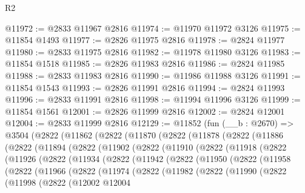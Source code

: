 \begin{lexlean}{R2}
\begin{coremodule}
@11972 := @2833 @11967 @2816
@11974 := @11970 @11972 @3126
@11975 := @11854 @1493
@11977 := @2826 @11975 @2816
@11978 := @2824 @11977
@11980 := @2833 @11975 @2816
@11982 := @11978 @11980 @3126
@11983 := @11854 @1518
@11985 := @2826 @11983 @2816
@11986 := @2824 @11985
@11988 := @2833 @11983 @2816
@11990 := @11986 @11988 @3126
@11991 := @11854 @1543
@11993 := @2826 @11991 @2816
@11994 := @2824 @11993
@11996 := @2833 @11991 @2816
@11998 := @11994 @11996 @3126
@11999 := @11854 @1561
@12001 := @2826 @11999 @2816
@12002 := @2824 @12001
@12004 := @2833 @11999 @2816
@12129 := @11852
    (fun (__b : @2670) =>
    @3504
      (@2822
        (@11862
          (@2822
            (@11870
              (@2822
                (@11878
                  (@2822
                    (@11886
                      (@2822
                        (@11894
                          (@2822
                            (@11902
                              (@2822
                                (@11910
                                  (@2822
                                    (@11918
                                      (@2822
                                        (@11926
                                          (@2822
                                            (@11934
                                              (@2822
                                                (@11942
                                                  (@2822
                                                    (@11950
                                                      (@2822
                                                        (@11958
                                                          (@2822
                                                            (@11966
                                                              (@2822
                                                                (@11974
                                                                  (@2822
                                                                    (@11982
                                                                      (@2822
                                                                        (@11990
                                                                          (@2822
                                                                            (@11998
                                                                              (@2822
                                                                                (@12002
                                                                                  @12004

\end{coremodule}
\end{lexlean}

